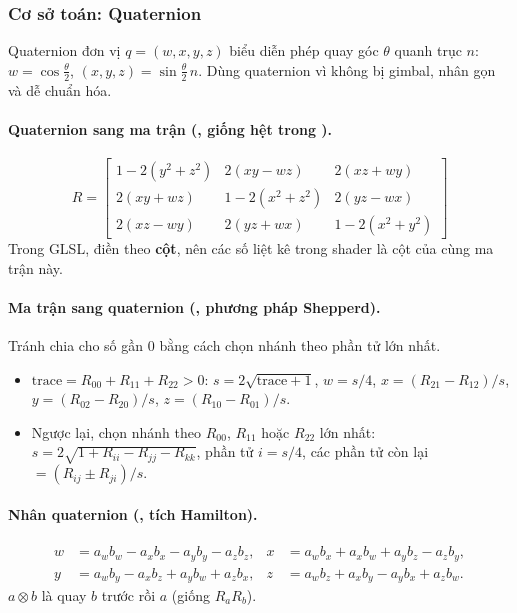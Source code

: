 \subsubsection{Cơ sở toán: Quaternion}\label{s:quat}
Quaternion đơn vị $q=(w,x,y,z)$ biểu diễn phép quay góc $\theta$ quanh trục $n$: $w=\cos\frac\theta2$, $(x,y,z)=\sin\frac\theta2\,n$. Dùng quaternion vì không bị gimbal, nhân gọn và dễ chuẩn hóa.

\paragraph{Quaternion sang ma trận (, giống hệt trong ).}
\[
R=\begin{bmatrix}
1-2(y^2+z^2) & 2(xy-wz) & 2(xz+wy)\\
2(xy+wz) & 1-2(x^2+z^2) & 2(yz-wx)\\
2(xz-wy) & 2(yz+wx) & 1-2(x^2+y^2)
\end{bmatrix}
\]
Trong GLSL,  điền theo \textbf{cột}, nên các số liệt kê trong shader là cột của cùng ma trận này.

\paragraph{Ma trận sang quaternion (, phương pháp Shepperd).}
Tránh chia cho số gần 0 bằng cách chọn nhánh theo phần tử lớn nhất.
\begin{itemize}
\item $\mathrm{trace}=R_{00}+R_{11}+R_{22}>0$: $s=2\sqrt{\mathrm{trace}+1}$, $w=s/4$, $x=(R_{21}-R_{12})/s$, $y=(R_{02}-R_{20})/s$, $z=(R_{10}-R_{01})/s$.
\item Ngược lại, chọn nhánh theo $R_{00}$, $R_{11}$ hoặc $R_{22}$ lớn nhất: $s=2\sqrt{1+R_{ii}-R_{jj}-R_{kk}}$, phần tử $i=s/4$, các phần tử còn lại $=(R_{ij}\pm R_{ji})/s$.
\end{itemize}

\paragraph{Nhân quaternion (, tích Hamilton).}
\begin{align*}
w&=a_wb_w-a_xb_x-a_yb_y-a_zb_z, & x&=a_wb_x+a_xb_w+a_yb_z-a_zb_y,\\
y&=a_wb_y-a_xb_z+a_yb_w+a_zb_x, & z&=a_wb_z+a_xb_y-a_yb_x+a_zb_w.
\end{align*}
$a\otimes b$ là quay $b$ trước rồi $a$ (giống $R_aR_b$).

